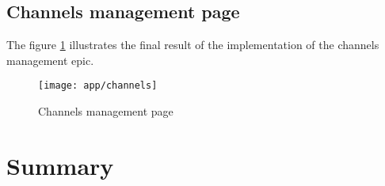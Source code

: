 \subsection{Channels management page}
The figure \ref{ss-channels} illustrates the final result of the implementation of the channels management epic.
\begin{figure}[hbt!]
    \centering
    \texttt{[image: app/channels]}
    \caption{Channels management page}
    \label{ss-channels}
\end{figure}

\section*{Summary}
